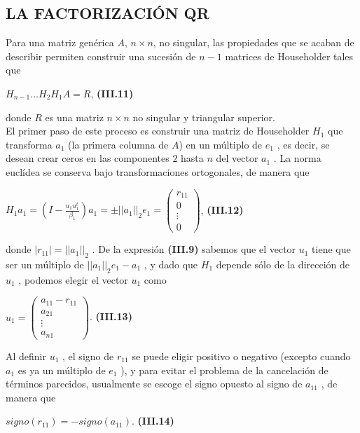 \documentclass[twocolumn,twoside]{article}
\begin{document}
\subsection{LA FACTORIZACI\'ON QR}
Para una matriz gen\'erica $A$, $n\times n$, no singular, las propiedades que se acaban de
describir permiten construir una sucesi\'on de $n-1$ matrices de Householder tales que
\begin{center}
  $H_{n-1} \dots H_2 H_1 A = R $, \hspace{1cm}\textbf{(III.11)}
\end{center}
donde $R$ es una matriz $n\times n$ no singular y triangular superior.\\
El primer paso de este proceso es construir una matriz de Householder $H_1$ que
transforma $a_1$ (la primera columna de $A$) en un m\'ultiplo de $e_1$ , es decir, se desean crear
ceros en las componentes $2$ hasta $n$ del vector $a_1$ . La norma eucl\'idea se conserva bajo
transformaciones ortogonales, de manera que
\begin{center}
  $H_1a_1 = (I-\frac{u_1u_1^t}{\beta_1})a_1 =\pm ||a_1||_2e_1= \left(\begin{array}{c}
    r_{11}\\ 
    0\\
    \vdots\\
    0
   \end{array}\right)$, \hspace{1cm}\textbf{(III.12)}
\end{center}
donde $|r_{11} | = ||a_1||_2$ . De la expresi\'on \textbf{(III.9)} sabemos que el vector $u_1$ tiene que ser un
m\'ultiplo de $||a_1||_2e_1-a_1$ , y dado que $H_1$ depende s\'olo de la direcci\'on de $u_1$ , podemos
elegir el vector $u_1$ como
\begin{center}
  $u_1= \left(\begin{array}{c}
    a_{11}-r_{11}\\ 
    a_{21}\\
    \vdots\\
    a_{n1}
   \end{array}\right)$. \hspace{1.5cm}\textbf{(III.13)}
\end{center}
Al definir $u_1$ , el signo de $r_{11}$ se puede eligir positivo o negativo (excepto cuando $a_1$ es
ya un m\'ultiplo de $e_1$ ), y para evitar el problema de la cancelaci\'on de t\'erminos parecidos,
usualmente se escoge el signo opuesto al signo de $a_{11}$ , de manera que
\begin{center}
  $signo(r_{11})=-signo(a_{11})$. \hspace{1.5cm}\textbf{(III.14)}
\end{center}
\end{document}
